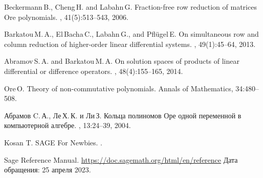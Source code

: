 

\renewcommand*\refname{Литература} %
% 
% 

\begin{thebibliography}{1}
    Beckermann\,B., Cheng\,H. and Labahn\,G.
    \newblock Fraction-free row reduction of matrices Ore polynomials.
    , 41(5):513--543, 2006.

    Barkatou\,M.\,A., El\,Bacha\,C., Labahn\,G., and Pfl\"ugel\,E.
    \newblock On simultaneous row and column reduction of higher-order linear
      differential systems.
    , 49(1):45--64, 2013.
    
    Abramov\,S.\,A. and Barkatou\,M.\,A.
    \newblock On solution spaces of products of linear differential or difference
      operators.
    , 48(4):155--165, 2014.

    Ore\,O.
    \newblock Theory of non-commutative polynomials.
    \newblock Annals of Mathematics, 34:480--508.
    
    Абрамов C.\,А., Ле\,Х.\,К. и Ли\,З.
    \newblock Кольца полиномов Оре одной
      переменной в компьютерной алгебре.
    , 13:24--39, 2004.
    
    Kosan T.
    \newblock SAGE For Newbies.
    .
    
    Sage Reference Manual.
    \newblock
      \url{https://doc.sagemath.org/html/en/reference}
    \newblock Дата обращения: 25 апреля 2023.
    \end{thebibliography}